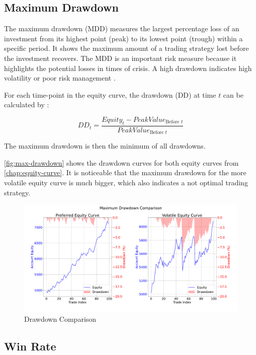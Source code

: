 \subsection{Maximum Drawdown}

The maximum drawdown (MDD) measures the largest percentage loss of an investment from its highest point (peak) to its lowest point (trough) within a specific period.
It shows the maximum amount of a trading strategy lost before the investment recovers.
The MDD is an important risk measure because it highlights the potential losses in times of crisis.
A high drawdown indicates high volatility or poor risk management \cite{mdd}.

For each time-point in the equity curve, the drawdown (DD) at time $t$ can be calculated by \cite{dd}:

\[
    DD_t = \frac{Equity_t - PeakValue_{\text{Before }t}}{PeakValue_{\text{Before }t}}

\]

\noindent
The maximum drawdown is then the minimum of all drawdowns.

\autoref{fig:max-drawdown} shows the drawdown curves for both equity curves from \autoref{chap:equity-curve}.
It is noticeable that the maximum drawdown for the more volatile equity curve is much bigger, which also indicates a not optimal trading strategy.

\begin{figure}[H]
    \centering
    \includegraphics[width=\textwidth]{images/trading-strategies/max-drawdown}
    \caption{Drawdown Comparison}
    \label{fig:max-drawdown}
\end{figure}

\subsection{Win Rate}
\label{chap:win-rate}


